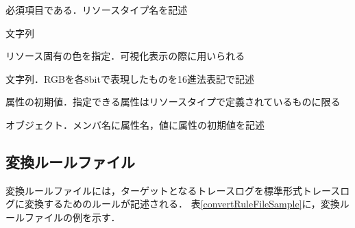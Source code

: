 \begin{description}
\begin{description}
        \begin{description}
        {\nopagebreak
        \item[\texttt{Type}]  \mbox{}
            \vspace{-0.25zw}
            \begin{description}
            \setlength{\itemsep}{-1.5\itemsep}
            \item[説明] 必須項目である．リソースタイプ名を記述
            \item[値] 文字列
            \end{description}
        }{\nopagebreak
        \item[\texttt{Color}]  \mbox{}
            \vspace{-0.25zw}
            \begin{description}
            \setlength{\itemsep}{-1.5\itemsep}
            \item[説明] リソース固有の色を指定．可視化表示の際に用いられる
            \item[値] 文字列．RGBを各8bitで表現したものを16進法表記で記述
            \end{description}
        }{\nopagebreak
        \item[\texttt{Attributes}]  \mbox{}
            \vspace{-0.25zw}
            \begin{description}
            \setlength{\itemsep}{-1.5\itemsep}
            \item[説明] 属性の初期値．指定できる属性はリソースタイプで定義されているものに限る
            \item[値] オブジェクト．メンバ名に属性名，値に属性の初期値を記述
            \end{description}
        }
        \end{description}
    \end{description}
\end{description}

\subsection{変換ルールファイル}
\label{subsec:cnvFile}

変換ルールファイルには，ターゲットとなるトレースログを標準形式トレースログに変換するためのルールが記述される．
表\ref{convertRuleFileSample}に，変換ルールファイルの例を示す．

